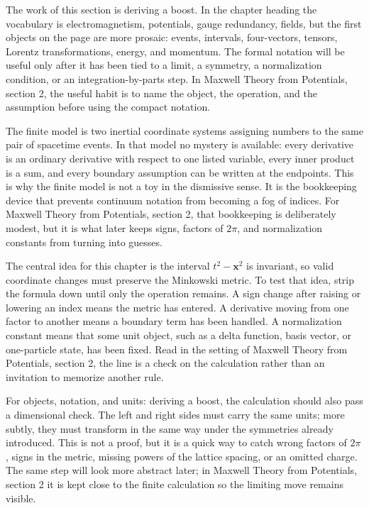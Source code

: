 The work of this section is deriving a boost.  In the chapter heading the vocabulary is electromagnetism, potentials, gauge redundancy, fields, but the first objects on the page are more prosaic: events, intervals, four-vectors, tensors, Lorentz transformations, energy, and momentum.  The formal notation will be useful only after it has been tied to a limit, a symmetry, a normalization condition, or an integration-by-parts step.  In Maxwell Theory from Potentials, section 2, the useful habit is to name the object, the operation, and the assumption before using the compact notation.

The finite model is two inertial coordinate systems assigning numbers to the same pair of spacetime events.  In that model no mystery is available: every derivative is an ordinary derivative with respect to one listed variable, every inner product is a sum, and every boundary assumption can be written at the endpoints.  This is why the finite model is not a toy in the dismissive sense.  It is the bookkeeping device that prevents continuum notation from becoming a fog of indices.  For Maxwell Theory from Potentials, section 2, that bookkeeping is deliberately modest, but it is what later keeps signs, factors of \(2\pi\), and normalization constants from turning into guesses.

The central idea for this chapter is the interval \(t^2-\bm x^2\) is invariant, so valid coordinate changes must preserve the Minkowski metric.  To test that idea, strip the formula down until only the operation remains.  A sign change after raising or lowering an index means the metric has entered.  A derivative moving from one factor to another means a boundary term has been handled.  A normalization constant means that some unit object, such as a delta function, basis vector, or one-particle state, has been fixed.  Read in the setting of Maxwell Theory from Potentials, section 2, the line is a check on the calculation rather than an invitation to memorize another rule.

For objects, notation, and units: deriving a boost, the calculation should also pass a dimensional check.  The left and right sides must carry the same units; more subtly, they must transform in the same way under the symmetries already introduced.  This is not a proof, but it is a quick way to catch wrong factors of \(2\pi\), signs in the metric, missing powers of the lattice spacing, or an omitted charge.  The same step will look more abstract later; in Maxwell Theory from Potentials, section 2 it is kept close to the finite calculation so the limiting move remains visible.

